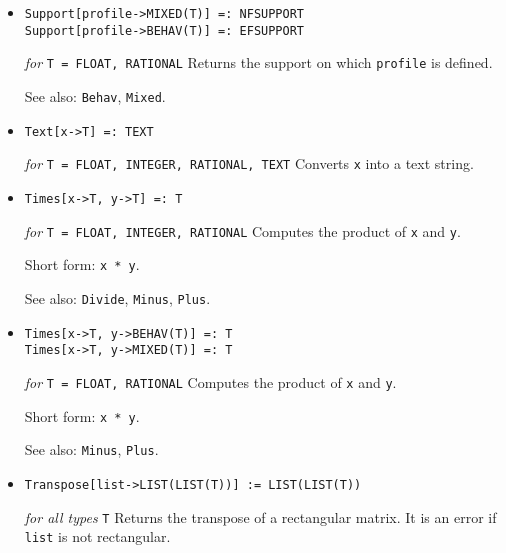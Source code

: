 \begin{itemize}
\item{}
\protect \large \begin{verbatim}
Support[profile->MIXED(T)] =: NFSUPPORT
Support[profile->BEHAV(T)] =: EFSUPPORT
\end{verbatim}\normalsize

{\it for} {\tt T = FLOAT, RATIONAL}
\bd
Returns the support on which \verb+profile+ is defined.
\item [See also:] \verb+Behav+, \verb+Mixed+.
\ed


\item{}
\protect \large \begin{verbatim}
Text[x->T] =: TEXT
\end{verbatim} \normalsize

{\it for} {\tt T = FLOAT, INTEGER, RATIONAL, TEXT}
\bd
Converts \verb+x+ into a text string.
\ed

\item{} 
\protect \large \begin{verbatim}
Times[x->T, y->T] =: T
\end{verbatim} \normalsize

{\it for} {\tt T = FLOAT, INTEGER, RATIONAL}
\bd
Computes the product of \verb+x+ and \verb+y+.
\item [Short form:] \verb+x * y+.
\item [See also:] \verb+Divide+, \verb+Minus+, \verb+Plus+.
\ed

\item{}
\protect \large \begin{verbatim}
Times[x->T, y->BEHAV(T)] =: T
Times[x->T, y->MIXED(T)] =: T
\end{verbatim} \normalsize

{\it for} {\tt T = FLOAT, RATIONAL}
\bd
Computes the product of \verb+x+ and \verb+y+.
\item [Short form:] \verb+x * y+.
\item [See also:] \verb+Minus+, \verb+Plus+.
\ed

\item{}
\protect \large \begin{verbatim} 
Transpose[list->LIST(LIST(T))] := LIST(LIST(T))
\end{verbatim}\normalsize

{\it for all types} {\tt T}
\bd
Returns the transpose of a rectangular matrix.  It is an error if \verb+list+
is not rectangular.
\ed



\end{itemize}
